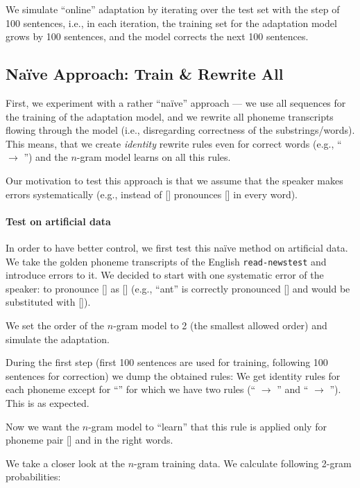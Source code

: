 We simulate ``online'' adaptation by iterating over the test set with the step of 100 sentences, i.e., in each iteration, the training set for the adaptation model grows by 100 sentences, and the model corrects the next 100 sentences.

\subsection{Na\"ive Approach: Train \& Rewrite All}
First, we experiment with a rather ``na\"ive'' approach --- we use all sequences for the training of the adaptation model, and we rewrite all phoneme transcripts flowing through the model (i.e., disregarding correctness of the substrings/words). This means, that we create \emph{identity} rewrite rules even for correct words (e.g., `` $\rightarrow$ '') and the $n$-gram model learns on all this rules. 

Our motivation to test this approach is that we assume that the speaker makes errors systematically (e.g., instead of [] pronounces [] in every word).

\paragraph{Test on artificial data}
In order to have better control, we first test this na\"ive method on artificial data. We take the golden phoneme transcripts of the English \texttt{read-news\-test} and introduce errors to it. We decided to start with one systematic error of the speaker: to pronounce [] as [] (e.g., ``ant'' is correctly pronounced [] and would be substituted with []). 

We set the order of the $n$-gram model to 2 (the smallest allowed order) and simulate the adaptation. 

During the first step (first 100 sentences are used for training, following 100 sentences for correction) we dump the obtained rules: We get identity rules for each phoneme except for ``'' for which we have two rules (`` $\rightarrow$ '' and `` $\rightarrow$ ''). This is as expected. 

Now we want the $n$-gram model to ``learn'' that this rule is applied only for phoneme pair [] and in the right words.

We take a closer look at the $n$-gram training data. We calculate following 2-gram probabilities:   

